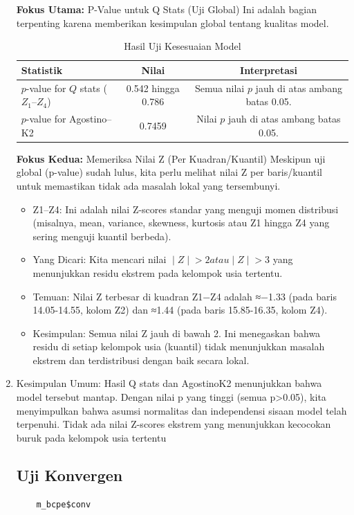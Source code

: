 \documentclass[11pt, a4paper]{article}
\begin{document}
\begin{enumerate}
\noindent
\textbf{Fokus Utama:} P-Value untuk Q Stats (Uji Global)
Ini adalah bagian terpenting karena memberikan kesimpulan global tentang kualitas model.
\begin{table}[ht]
\centering
\caption{Hasil Uji Kesesuaian Model}
\label{tab:goodness_of_fit}
\begin{tabular}{lcc}
\toprule
\textbf{Statistik} & \textbf{Nilai} & \textbf{Interpretasi} \\
\midrule
$p$-value for $Q$ stats ($Z_1$--$Z_4$) & 0.542 hingga 0.786 & Semua nilai $p$ jauh di atas ambang batas 0.05. \\
\midrule
$p$-value for Agostino--K2 & 0.7459 & Nilai $p$ jauh di atas ambang batas 0.05. \\
\bottomrule
\end{tabular}
\end{table}

\noindent
\textbf{Fokus Kedua:} Memeriksa Nilai Z (Per Kuadran/Kuantil)
Meskipun uji global (p-value) sudah lulus, kita perlu melihat nilai Z per baris/kuantil untuk memastikan tidak ada masalah lokal yang tersembunyi.
    \begin{itemize}
        \item Z1–Z4: Ini adalah nilai Z-scores standar yang menguji momen distribusi (misalnya, mean, variance, skewness, kurtosis atau Z1​ hingga Z4​ yang sering menguji kuantil berbeda).
        \item Yang Dicari: Kita mencari nilai $∣Z∣>2 atau ∣Z∣>3$ yang menunjukkan residu ekstrem pada kelompok usia tertentu.
        \item Temuan: Nilai Z terbesar di kuadran Z1​−Z4​ adalah ≈−1.33 (pada baris 14.05-14.55, kolom Z2​) dan ≈1.44 (pada baris 15.85-16.35, kolom Z4​).
        \item Kesimpulan: Semua nilai Z jauh di bawah 2. Ini menegaskan bahwa residu di setiap kelompok usia (kuantil) tidak menunjukkan masalah ekstrem dan terdistribusi dengan baik secara lokal.
    \end{itemize}
\item Kesimpulan Umum:
Hasil Q stats dan AgostinoK2 menunjukkan bahwa model tersebut mantap. Dengan nilai p yang tinggi (semua p>0.05), kita menyimpulkan bahwa asumsi normalitas dan independensi sisaan model telah terpenuhi. Tidak ada nilai Z-scores ekstrem yang menunjukkan kecocokan buruk pada kelompok usia tertentu

\subsection{Uji Konvergen}
    \begin{lstlisting}
    m_bcpe$conv


\end{lstlisting}
\end{enumerate}
\end{document}

